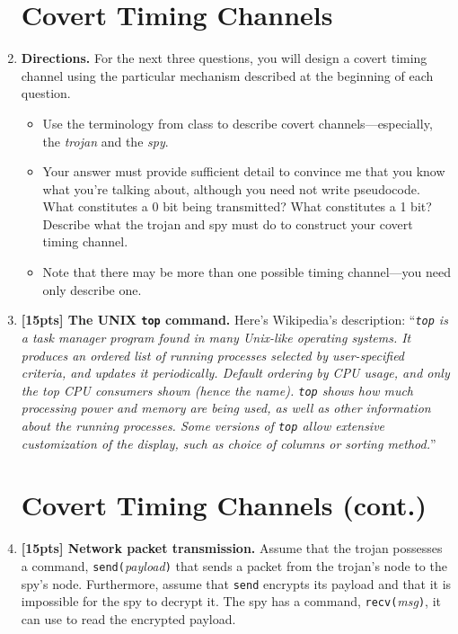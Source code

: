\documentclass[12pt]{article}
\begin{document}
\begin{enumerate}
\section{Covert Timing Channels}
\item[] {\bf Directions.} For the next three questions, you will design a covert timing channel using the particular mechanism described at the beginning of each question. 
\begin{itemize}
\item Use the terminology from class to describe covert channels---especially, the \emph{trojan} and the \emph{spy}. 
\item Your answer must provide sufficient detail to convince me that you know what you're talking about, although you need not write pseudocode. What constitutes a 0 bit being transmitted? What constitutes a 1 bit? Describe what the trojan and spy must do to construct your covert timing channel.
\item Note that there may be more than one possible timing channel---you need only describe one.
\end{itemize}

\item {\textbf{[15pts] The UNIX {\tt top} command.}} Here's Wikipedia's description:
``\emph{{\tt top} is a task manager program found in many Unix-like operating systems. It produces an ordered list of running processes selected by user-specified criteria, and updates it periodically. Default ordering by CPU usage, and only the top CPU consumers shown (hence the name). {\tt top} shows how much processing power and memory are being used, as well as other information about the running processes. Some versions of {\tt top} allow extensive customization of the display, such as choice of columns or sorting method.}''

\newpage
\section*{Covert Timing Channels (cont.)}
\item {\textbf{[15pts] Network packet transmission.}} Assume that the trojan possesses a command, {\tt send(}{\textit{payload}{\texttt{)}}} that sends a packet from the trojan's node to the spy's node. Furthermore, assume that {\tt send} encrypts its payload and that it is impossible for the spy to decrypt it. The spy has a command, {\tt recv(}{\textit{msg}}{\texttt{)}}, it can use to read the encrypted payload. 


\end{enumerate}
\end{document}
